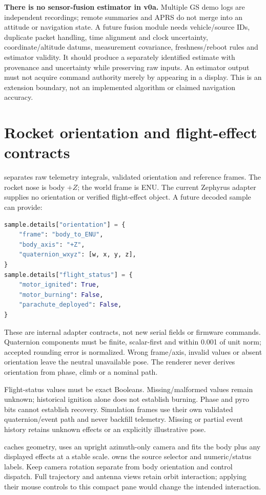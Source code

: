 \textbf{There is no sensor-fusion estimator in v0a.} Multiple GS demo logs are
independent recordings; remote summaries and APRS do not merge into an attitude
or navigation state. A future fusion module needs vehicle/source IDs, duplicate
packet handling, time alignment and clock uncertainty, coordinate/altitude
datums, measurement covariance, freshness/reboot rules and estimator validity.
It should produce a separately identified estimate with provenance and
uncertainty while preserving raw inputs. An estimator output must not acquire
command authority merely by appearing in a display. This is an extension
boundary, not an implemented algorithm or claimed navigation accuracy.

\section{Rocket orientation and flight-effect contracts}\label{sec:pose}
 separates raw telemetry integrals, validated orientation
and reference frames. The rocket nose is body $+Z$; the world frame is ENU.
The current Zephyrus adapter supplies no orientation or verified flight-effect
object. A future decoded sample can provide:
\begin{lstlisting}[language=Python]
sample.details["orientation"] = {
    "frame": "body_to_ENU",
    "body_axis": "+Z",
    "quaternion_wxyz": [w, x, y, z],
}
sample.details["flight_status"] = {
    "motor_ignited": True,
    "motor_burning": False,
    "parachute_deployed": False,
}
\end{lstlisting}
These are internal adapter contracts, not new serial fields or firmware
commands. Quaternion components must be finite, scalar-first and within
0.001 of unit norm; accepted rounding error is normalized. Wrong frame/axis,
invalid values or absent orientation leave the neutral unavailable pose.
The renderer never derives orientation from phase, climb or a nominal path.

Flight-status values must be exact Booleans. Missing/malformed values remain
unknown; historical ignition alone does not establish burning. Phase and pyro
bits cannot establish recovery. Simulation frames use their own validated
quaternion/event path and never backfill telemetry. Missing or partial event
history retains unknown effects or an explicitly illustrative pose.

 caches geometry, uses an upright azimuth-only
camera and fits the body plus any displayed effects at a stable scale.
 owns the source selector and numeric/status labels.
Keep camera rotation separate from body orientation and control dispatch.
Full trajectory and antenna views retain orbit interaction; applying their
mouse controls to this compact pane would change the intended interaction.
